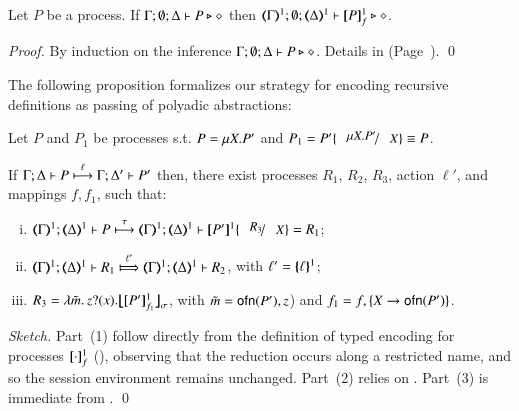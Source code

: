 \begin{proposition}\myrm
	\label{prop:typepres_HOp_to_HO}
	Let $P$ be a \HOp process.
	If $\Gamma; \emptyset; \Delta \vdash P \triangleright \diamond$ then 
	$\tmap{\Gamma}{1}; \emptyset; \tmap{\Delta}{1} \proves \pmapp{P}{1}{f} \hastype \Proc$. 
\end{proposition}

\begin{proof}
	By induction on the inference $\Gamma; \emptyset; \Delta \vdash P \triangleright \diamond$.
	Details in  (Page~\pageref{app:prop:typepres_HOp_to_HO}).
	\qed
\end{proof}

The following proposition formalizes our strategy  for encoding
recursive definitions as passing of polyadic abstractions:
%
\begin{proposition}\myrm
	\label{prop:op_corr_HOprec_to_HO}
	Let $P$ and $P_1$ be \HOp processes s.t. 
	$P =\mu X. P'$ and
	$P_1 = P'\subst{\recp{X}{P'}}{\varp{X}} \scong P$.

	\noi If %
	$\Gamma; \Delta \vdash P \stackrel{\ell}{\longmapsto} \Gamma; \Delta' \vdash P' $
	then,  there exist
	processes $R_1$, $R_2$,  $R_3$, action $\ell'$,
	and mappings $f, f_1$, such that: 
	\begin{enumerate}[(i)]
		\item 
		$\stytra{\mapt{\Gamma}^{1}}{\tau}{\mapt{\Delta}^{1}}{P}{\mapt{\Delta}^{1}}{\map{P'}^{1}\subst{R_3}{X}} = R_1$;
		\item 
		$\wtytra{\mapt{\Gamma}^{1}}{\ell'}{\mapt{\Delta}^{1}}{R_1}{\mapt{\Delta}^{1}}{R_2} $,  with $\ell' = \{\!\!\{\ell\}\!\!\}^{1}$;
	
		\item $R_3 = \abs{\tilde{m}}\binp{z}{x}\auxmap{\map{P'}^{1}_{f_{1}}}{\sigma}$, with $\tilde{m} = \mathsf{ofn}(P'),z$)
		and
		$f_1 = f, \{X \to \mathsf{ofn}(P')\}$.
	\end{enumerate}
\end{proposition}

\begin{proof}[Sketch]
	Part~(1) follow directly from the definition of typed encoding for processes $[\!\![\cdot]\!\!]^{1}_{f}$ (),
	observing that the reduction occurs along a restricted name, and so the session environment remains unchanged.
	Part~(2) relies on  .
	Part~(3) is immediate from .
	\qed
\end{proof}

